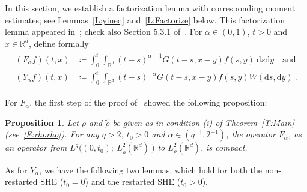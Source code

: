 \documentclass[a4paper,11pt]{article}%
\theoremstyle{plain}
\newtheorem{proposition}[theorem]{Proposition}
\theoremstyle{definition}
\numberwithin{equation}{section}
\newcommand{\R}{\mathbb{R}}
\newcommand{\ud}{\ensuremath{\mathrm{d}}}
\begin{document}
In this section, we establish a factorization lemma with corresponding moment estimates; see
Lemmas~\ref{L:yineq} and~\ref{L:Factorize} below. This factorization lemma appeared
in~\cite{da-prato.kwapien.ea:87:regularity}; check also Section 5.3.1
of~\cite{da-prato.zabczyk:14:stochastic}. For $\alpha\in (0,1)$, $t>0$ and $x\in\R^d$, define
formally
\begin{align}\label{E:Ops}
  \begin{aligned}
    \left(F_{\alpha} f\right)(t,x) & \coloneqq \int_0^{t} \int_{\R^d} (t-s)^{\alpha-1}G(t-s,x-y)f(s,y)\: \ud s \ud y \quad \text{and} \\
    \left(Y_{\alpha} f\right)(t,x) & \coloneqq \int_0^{t} \int_{\R^d} (t-s)^{-\alpha}G(t-s,x-y)f(s,y) W(\ud s,\ud y) \:.
  \end{aligned}
\end{align}

For $F_\alpha$, the first step of the proof of~\cite[Theorem 3.1]{tessitore.zabczyk:98:invariant}
showed the following proposition:
\begin{proposition}\label{P:F-Comp}
  Let $\rho$ and $\tilde{\rho}$ be given as in condition (i) of Theorem~\ref{T:Main}
  (see~\eqref{E:rhorho}). For any $q>2$, $t_0>0$ and $\alpha \in (q^{-1},2^{-1})$, the operator
  $F_\alpha$, as an operator from $L^q\big((0,t_0);\: L^2_{\tilde{\rho}}(\R^d)\: \big)$ to
  $L^2_\rho(\R^d)$, is compact.
\end{proposition}

As for $Y_\alpha$, we have the following two lemmas, which hold for both the non-restarted SHE
($t_0 = 0$) and the restarted SHE ($t_0 > 0$).
\end{document}
